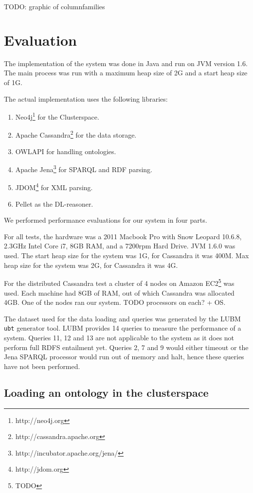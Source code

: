 \documentclass[conference]{IEEEtran}
\begin{document}
TODO: graphic of columnfamilies

\section{Evaluation}

The implementation of the system was done in Java and run on JVM version 1.6. The main
process was run with a maximum heap size of 2G and a start heap size of 1G.

The actual implementation uses the following libraries:
\begin{enumerate}
    \item Neo4j\footnote{http://neo4j.org} for the Clusterspace.
    \item Apache Cassandra\footnote{http://cassandra.apache.org} for the data storage.
    \item OWLAPI\cite{Hor:09} for handling ontologies.
    \item Apache Jena\footnote{http://incubator.apache.org/jena/} for SPARQL and RDF parsing.
    \item JDOM\footnote{http://jdom.org} for XML parsing.
    \item Pellet\cite{Parsia04pellet:an} as the DL-reasoner.
\end{enumerate}

We performed performance evaluations for our system in four parts.

For all tests, the hardware was a 2011 Macbook Pro with Snow Leopard 10.6.8,
2.3GHz Intel Core i7, 8GB RAM, and a 7200rpm Hard Drive.  JVM 1.6.0 was used.
  The start heap size for the system was 1G, for Cassandra it was 400M. Max
  heap size for the system was 2G, for Cassandra it was 4G.

For the distributed Cassandra test a cluster of 4 nodes on Amazon
EC2\footnote{TODO} was used.  Each machine had 8GB of RAM, out of which
Cassandra was allocated 4GB. One of the nodes ran our system. TODO processors on each?
+ OS.

The dataset used for the data loading and queries was generated by the LUBM \texttt{ubt} generator tool. LUBM provides 14 queries to measure the performance of a system. Queries 11, 12 and 13 are not applicable to the system as it does not perform full RDFS entailment yet. Queries 2, 7 and 9 would either timeout or the Jena SPARQL processor would run out of memory and halt, hence these queries have not been performed.

\subsection{Loading an ontology in the clusterspace}
\end{document}
